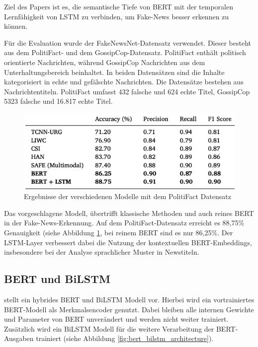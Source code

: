 Ziel des Papers ist es, die semantische Tiefe von BERT mit der temporalen Lernfähigkeit von LSTM zu verbinden, um Fake-News besser erkennen zu können.

Für die Evaluation wurde der FakeNewsNet-Datensatz verwendet. Dieser besteht aus dem PolitiFact- und dem GossipCop-Datensatz. 
PolitiFact enthält politisch orientierte Nachrichten, während GossipCop Nachrichten aus dem Unterhaltungsbereich beinhaltet. 
In beiden Datensätzen sind die Inhalte kategorisiert in echte und gefälschte Nachrichten. 
Die Datensätze bestehen aus Nachrichtentiteln. PolitiFact umfasst 432 falsche und 624 echte Titel, GossipCop 5323 falsche und 16.817 echte Titel.

\begin{figure}[htbp]
    \begin{center}
    \includegraphics[scale=0.5]{static/bert_lstm_politifact.png}
    \caption{\label{fig:bert_lstm_politifact} Ergebnisse der verschiedenen Modelle mit dem PolitiFact Datensatz \cite{RAI202298}}
    \end{center}
\end{figure}

Das vorgeschlagene Modell, übertrifft klassische Methoden und auch reines BERT in der Fake-News-Erkennung. 
Auf dem PolitiFact-Datensatz erreicht es 88,75\% Genauigkeit (siehe Abbildung \ref{fig:bert_lstm_politifact}, bei reinem BERT sind es nur 86,25\%.
Der LSTM-Layer verbessert dabei die Nutzung der kontextuellen BERT-Embeddings, insbesondere bei der Analyse sprachlicher Muster in Newstiteln.

\subsection{BERT und BiLSTM}

\cite{wang2021covid19fakenewsdetection} stellt ein hybrides BERT und BiLSTM Modell vor. Hierbei wird ein vortrainiertes BERT-Modell als 
Merkmalsencoder genutzt. Dabei bleiben alle internen Gewichte und Parameter von BERT unverändert und werden nicht weiter trainiert. 
Zusätzlich wird ein BiLSTM Modell für die weitere Verarbeitung der BERT-Ausgaben trainiert (siehe Abbildung \ref{fig:bert_bilstm_architecture}).

